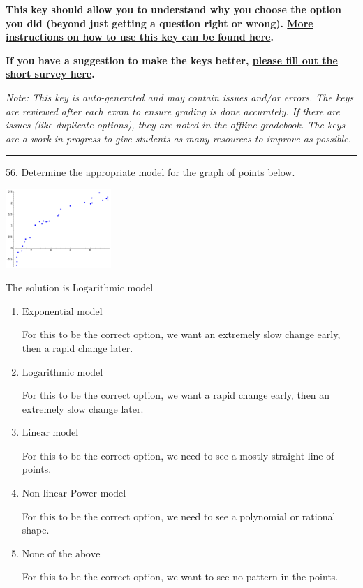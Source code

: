 \documentclass{extbook}[14pt]
\begin{document}
\textbf{This key should allow you to understand why you choose the option you did (beyond just getting a question right or wrong). \href{https://xronos.clas.ufl.edu/mac1105spring2020/courseDescriptionAndMisc/Exams/LearningFromResults}{More instructions on how to use this key can be found here}.}

\textbf{If you have a suggestion to make the keys better, \href{https://forms.gle/CZkbZmPbC9XALEE88}{please fill out the short survey here}.}

\textit{Note: This key is auto-generated and may contain issues and/or errors. The keys are reviewed after each exam to ensure grading is done accurately. If there are issues (like duplicate options), they are noted in the offline gradebook. The keys are a work-in-progress to give students as many resources to improve as possible.}

\rule{\textwidth}{0.4pt}

56. Determine the appropriate model for the graph of points below.
\begin{center} \includegraphics[width=0.3\textwidth]{../Figures/identifyModelGraph12C.png} \end{center} 

The solution is $ \text{Logarithmic model} $ 

\begin{enumerate}[label=\Alph*.] 
\item $ \text{Exponential model} $ 

 For this to be the correct option, we want an extremely slow change early, then a rapid change later. 
\item $ \text{Logarithmic model} $ 

 For this to be the correct option, we want a rapid change early, then an extremely slow change later. 
\item $ \text{Linear model} $ 

 For this to be the correct option, we need to see a mostly straight line of points. 
\item $ \text{Non-linear Power model} $ 

 For this to be the correct option, we need to see a polynomial or rational shape. 
\item $ \text{None of the above} $ 

 For this to be the correct option, we want to see no pattern in the points. 
\end{enumerate} 
 
\end{document}
